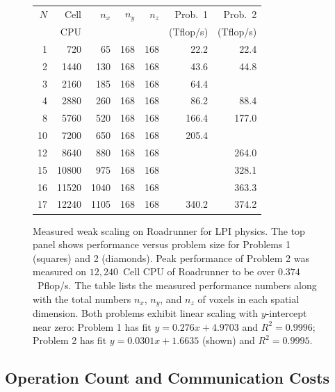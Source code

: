 \documentclass[journal,twoside]{IEEEtran}
\begin{document}
\begin{figure}
\begin{center}

\

\begin{tabular}{rrrrrrr}
\hline
\hline
$N$ &  Cell & $n_x$ & $n_y$ & $n_z$ &   Prob.~1 &   Prob.~2  \\
    &   CPU &       &       &       & (Tflop/s) & (Tflop/s)  \\
\hline
  1 &   720 &    65 &   168 &   168 &      22.2 &      22.4  \\ 
  2 &  1440 &   130 &   168 &   168 &      43.6 &      44.8  \\
  3 &  2160 &   185 &   168 &   168 &      64.4 &            \\
  4 &  2880 &   260 &   168 &   168 &      86.2 &      88.4  \\
  8 &  5760 &   520 &   168 &   168 &     166.4 &     177.0  \\
 10 &  7200 &   650 &   168 &   168 &     205.4 &            \\
 12 &  8640 &   880 &   168 &   168 &           &     264.0  \\
 15 & 10800 &   975 &   168 &   168 &           &     328.1  \\
 16 & 11520 &  1040 &   168 &   168 &           &     363.3  \\
 17 & 12240 &  1105 &   168 &   168 &     340.2 &     374.2  \\
\hline
\end{tabular}

\caption{
Measured weak scaling on Roadrunner for LPI physics.  The top panel
shows performance versus problem size for Problems 1 (squares) and 2
(diamonds).  Peak performance of Problem 2 was measured on
$12,240$~Cell CPU of Roadrunner to be over $0.374$~Pflop/s.  The table
lists the measured performance numbers along with the total numbers
$n_x$, $n_y$, and $n_z$ of voxels in each spatial dimension.  Both
problems exhibit linear scaling with $y$-intercept near zero: Problem
1 has fit $y=0.276x + 4.9703$ and $R^2=0.9996$; Problem 2 has fit
$y=0.0301x + 1.6635$ (shown) and $R^2 = 0.9995$.}
\label{fig:weakscaling}
\end{center}
\end{figure}

\subsection{Operation Count and Communication Costs}
\end{document}
